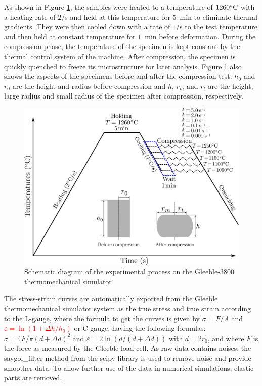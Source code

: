 \documentclass[metals,article,submit,pdftex,moreauthors]{Definitions/mdpi}
\begin{document}
As shown in Figure \ref{fig:GleebleProcess}, the samples were heated to a temperature of $1260\celsius$ with a heating rate of $2$\celsius/s and held at this temperature for $5$~min to eliminate thermal gradients.
They were then cooled down with a rate of $1$\celsius/s to the test temperature and then held at constant temperature for $1$~min before deformation.
During the compression phase, the temperature of the specimen is kept constant by the thermal control system of the machine.
After compression, the specimen is quickly quenched to freeze its microstructure for later analysis.
Figure \ref{fig:GleebleProcess} also shows the aspects of the specimens before and after the compression test: $h_0$ and $r_0$ are the height and radius before compression and $h$, $r_m$ and $r_t$ are the height, large radius and small radius of the specimen after compression, respectively.
\begin{figure}[!ht]
\centering
\includegraphics[width=0.8\columnwidth]{Figures/GleebleProcess}
\caption{Schematic diagram of the experimental process on the Gleeble-3800 thermomechanical simulator}
\label{fig:GleebleProcess}
\end{figure}

The stress-strain curves are automatically exported from the Gleeble thermomechanical simulator system as the true stress and true strain according to the L-gauge, where the formula to get the curves is given by $\sigma=F/A$ and \textcolor{red}{$\varepsilon=\ln\left(1+\Delta h / h_0\right)$} or C-gauge, having the following formulas: $\sigma = 4F/\pi(d+\Delta d)^2$ and $\varepsilon = 2\ln\left(d/(d+\Delta d)\right)$ with $d = 2r_0$, and where $F$ is the force as measured by the Gleeble load cell.
As raw data contains noises, the savgol\_filter method from the scipy library is used to remove noise and provide smoother data.
To allow further use of the data in numerical simulations, elastic parts are removed.
\end{document}
